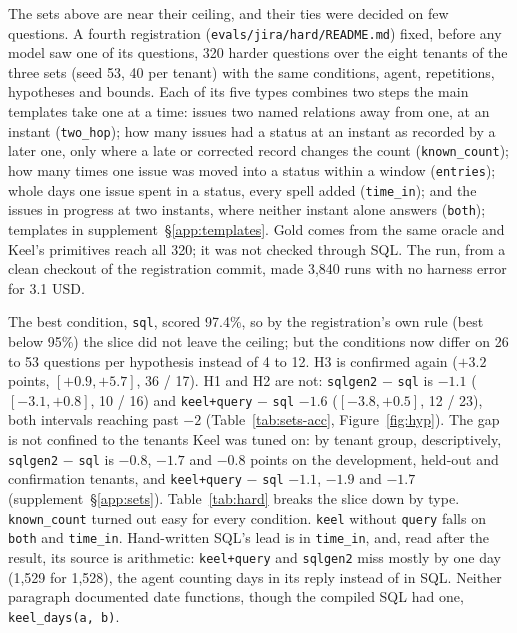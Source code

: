 \documentclass[sigconf, nonacm]{acmart}
\newcommand{\code}[1]{\texttt{#1}}
\begin{document}
The sets above are near their ceiling, and their ties were decided on few questions. A fourth registration (\code{evals/jira/hard/README.md}) fixed, before any model saw one of its questions, 320 harder questions over the eight tenants of the three sets (seed 53, 40 per tenant) with the same conditions, agent, repetitions, hypotheses and bounds. Each of its five types combines two steps the main templates take one at a time: issues two named relations away from one, at an instant (\code{two\_hop}); how many issues had a status at an instant as recorded by a later one, only where a late or corrected record changes the count (\code{known\_count}); how many times one issue was moved into a status within a window (\code{entries}); whole days one issue spent in a status, every spell added (\code{time\_in}); and the issues in progress at two instants, where neither instant alone answers (\code{both}); templates in supplement~\S\ref{app:templates}. Gold comes from the same oracle and Keel's primitives reach all 320; it was not checked through SQL. The run, from a clean checkout of the registration commit, made 3,840 runs with no harness error for 3.1 USD.

The best condition, \code{sql}, scored 97.4\%, so by the registration's own rule (best below 95\%) the slice did not leave the ceiling; but the conditions now differ on 26 to 53 questions per hypothesis instead of 4 to 12. H3 is confirmed again ($+3.2$ points, $[+0.9, +5.7]$, 36 / 17). H1 and H2 are not: \code{sqlgen2} $-$ \code{sql} is $-1.1$ ($[-3.1, +0.8]$, 10 / 16) and \code{keel+query} $-$ \code{sql} $-1.6$ ($[-3.8, +0.5]$, 12 / 23), both intervals reaching past $-2$ (Table~\ref{tab:sets-acc}, Figure~\ref{fig:hyp}). The gap is not confined to the tenants Keel was tuned on: by tenant group, descriptively, \code{sqlgen2} $-$ \code{sql} is $-0.8$, $-1.7$ and $-0.8$ points on the development, held-out and confirmation tenants, and \code{keel+query} $-$ \code{sql} $-1.1$, $-1.9$ and $-1.7$ (supplement~\S\ref{app:sets}). Table~\ref{tab:hard} breaks the slice down by type. \code{known\_count} turned out easy for every condition. \code{keel} without \code{query} falls on \code{both} and \code{time\_in}. Hand-written SQL's lead is in \code{time\_in}, and, read after the result, its source is arithmetic: \code{keel+query} and \code{sqlgen2} miss mostly by one day (1,529 for 1,528), the agent counting days in its reply instead of in SQL. Neither paragraph documented date functions, though the compiled SQL had one, \code{keel\_days(a, b)}.
\end{document}
